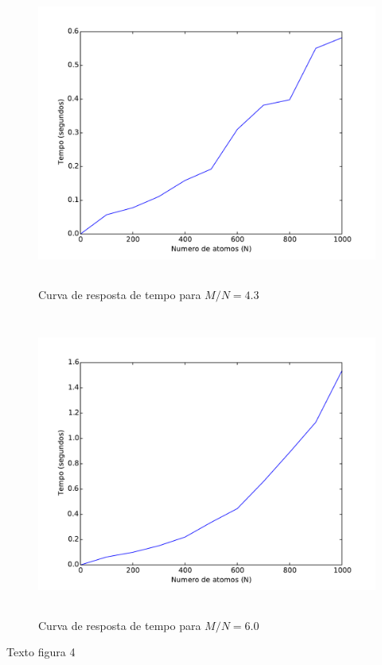 		\begin{figure}[H]
			\centering
			\includegraphics[height=10cm]{images/max2sat_mn43}
			\caption{Curva de resposta de tempo para $M/N=4.3$}
			\label{fig:max2satmn43}
		\end{figure}
		
		\begin{figure}[H]
			\centering
			\includegraphics[height=10cm]{images/max2sat_mn60}
			\caption{Curva de resposta de tempo para $M/N=6.0$}
			\label{fig:max2satmn60}
		\end{figure}
		Texto figura 4
		
